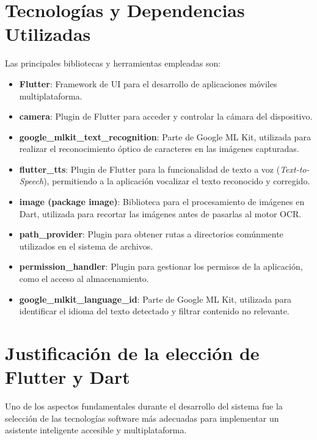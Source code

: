 \section{Tecnologías y Dependencias Utilizadas}
Las principales bibliotecas y herramientas empleadas son:
\begin{itemize}
	\item \textbf{Flutter}: Framework de UI para el desarrollo de aplicaciones móviles multiplataforma.
	\item \textbf{camera}: Plugin de Flutter para acceder y controlar la cámara del dispositivo.
	\item \textbf{google\_mlkit\_text\_recognition}: Parte de Google ML Kit, utilizada para realizar el reconocimiento óptico de caracteres en las imágenes capturadas.
	\item \textbf{flutter\_tts}: Plugin de Flutter para la funcionalidad de texto a voz (\textit{Text-to-Speech}), permitiendo a la aplicación vocalizar el texto reconocido y corregido.
	\item \textbf{image (package image)}: Biblioteca para el procesamiento de imágenes en Dart, utilizada para recortar las imágenes antes de pasarlas al motor OCR.
	\item \textbf{path\_provider}: Plugin para obtener rutas a directorios comúnmente utilizados en el sistema de archivos.
	\item \textbf{permission\_handler}: Plugin para gestionar los permisos de la aplicación, como el acceso al almacenamiento.
	\item \textbf{google\_mlkit\_language\_id}: Parte de Google ML Kit, utilizada para identificar el idioma del texto detectado y filtrar contenido no relevante.
\end{itemize}


\section{Justificación de la elección de Flutter y Dart}

Uno de los aspectos fundamentales durante el desarrollo del sistema fue la selección de las tecnologías software más adecuadas para implementar un asistente inteligente accesible y multiplataforma.

